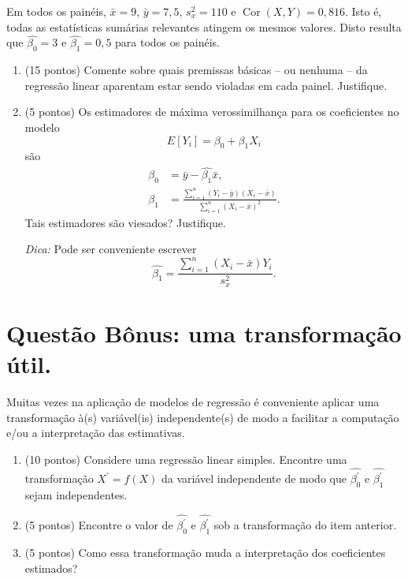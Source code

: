 \documentclass[a4paper,10pt, notitlepage]{report}
\begin{document}
   
Em todos os painéis, $\bar{x} = 9$, $\bar{y} = 7,5$, $s_x^2 = 110$ e $\operatorname{Cor}(X, Y) = 0,816$.
Isto é, todas as estatísticas sumárias relevantes atingem os mesmos valores.
Disto resulta que $\hat{\beta_0} = 3$ e $\hat{\beta_1}=0,5$ para todos os painéis.

\begin{enumerate}[label=\alph*)]
 \item (15 pontos) Comente sobre quais premissas básicas -- ou nenhuma -- da regressão linear aparentam estar sendo violadas em cada painel.
Justifique.
 \item (5 pontos) Os estimadores de máxima verossimilhança para os coeficientes no modelo
 \[ E[Y_i] = \beta_0 + \beta_1 X_i \]
 são 
 \begin{align*}
  \hat{\beta_0} &= \bar{y} - \hat{\beta_1}\bar{x},\\
  \hat{\beta_1} &= \frac{\sum_{i=1}^n (Y_i-\bar{y})(X_i-\bar{x})}{\sum_{i=1}^n \left(X_i - \bar{x}\right)^2}.
 \end{align*}
 Tais estimadores são viesados?
 Justifique.
 
 \textit{Dica:} Pode ser conveniente escrever
 $$\hat{\beta_1} = \frac{\sum_{i=1}^n \left(X_i-\bar{x}\right)Y_i}{s_x^2}.$$
 \end{enumerate}

\section*{Questão Bônus: uma transformação útil.} 

Muitas vezes na aplicação de modelos de regressão é conveniente aplicar uma transformação à(s) variável(is) independente(s) de modo a facilitar a computação e/ou a interpretação das estimativas.

\begin{enumerate}[label=\alph*)]
 \item (10 pontos)  Considere uma regressão linear simples.
 Encontre  uma transformação $X^\prime = f(X)$ da variável independente de modo que $\hat{\beta_0^\prime}$ e $\hat{\beta_1^\prime}$ sejam independentes. 
 \item (5 pontos) Encontre o valor de $\hat{\beta_0^\prime}$ e $\hat{\beta_1^\prime}$ sob a transformação do item anterior.
 \item (5 pontos) Como essa transformação muda a interpretação dos coeficientes estimados? 
\end{enumerate}
\end{document}
